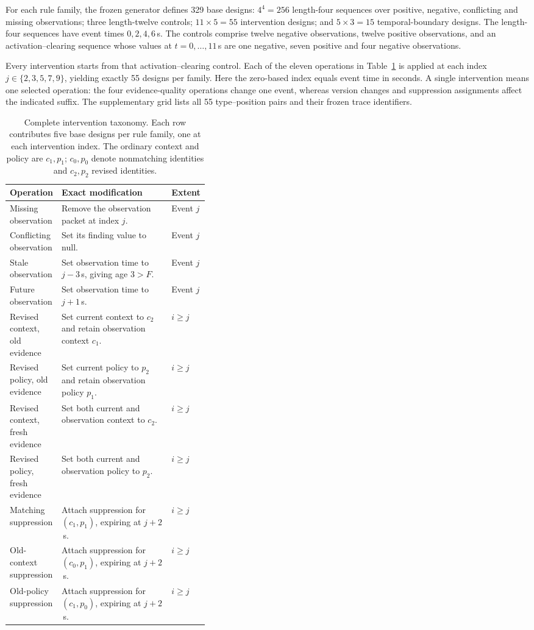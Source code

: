 For each rule family, the frozen generator defines 329 base designs: $4^4=256$ length-four sequences over positive, negative, conflicting and missing observations; three length-twelve controls; $11\times5=55$ intervention designs; and $5\times3=15$ temporal-boundary designs. The length-four sequences have event times $0,2,4,6$\,s. The controls comprise twelve negative observations, twelve positive observations, and an activation--clearing sequence whose values at $t=0,\ldots,11$\,s are one negative, seven positive and four negative observations.

Every intervention starts from that activation--clearing control. Each of the eleven operations in Table~\ref{tab:intervention-taxonomy} is applied at each index $j\in\{2,3,5,7,9\}$, yielding exactly 55 designs per family. Here the zero-based index equals event time in seconds. A single intervention means one selected operation: the four evidence-quality operations change one event, whereas version changes and suppression assignments affect the indicated suffix. The supplementary grid lists all 55 type--position pairs and their frozen trace identifiers.

\begin{table}[htbp]
\centering\small
\caption{Complete intervention taxonomy. Each row contributes five base designs per rule family, one at each intervention index. The ordinary context and policy are $c_1,p_1$; $c_0,p_0$ denote nonmatching identities and $c_2,p_2$ revised identities.}
\label{tab:intervention-taxonomy}
\begin{tabularx}{\linewidth}{@{}p{0.26\linewidth}Xp{0.12\linewidth}@{}}
\toprule
Operation & Exact modification & Extent \\
\midrule
Missing observation & Remove the observation packet at index $j$. & Event $j$ \\
Conflicting observation & Set its finding value to null. & Event $j$ \\
Stale observation & Set observation time to $j-3$\,s, giving age $3>F$. & Event $j$ \\
Future observation & Set observation time to $j+1$\,s. & Event $j$ \\
Revised context, old evidence & Set current context to $c_2$ and retain observation context $c_1$. & $i\ge j$ \\
Revised policy, old evidence & Set current policy to $p_2$ and retain observation policy $p_1$. & $i\ge j$ \\
Revised context, fresh evidence & Set both current and observation context to $c_2$. & $i\ge j$ \\
Revised policy, fresh evidence & Set both current and observation policy to $p_2$. & $i\ge j$ \\
Matching suppression & Attach suppression for $(c_1,p_1)$, expiring at $j+2$\,s. & $i\ge j$ \\
Old-context suppression & Attach suppression for $(c_0,p_1)$, expiring at $j+2$\,s. & $i\ge j$ \\
Old-policy suppression & Attach suppression for $(c_1,p_0)$, expiring at $j+2$\,s. & $i\ge j$ \\
\bottomrule
\end{tabularx}
\end{table}

